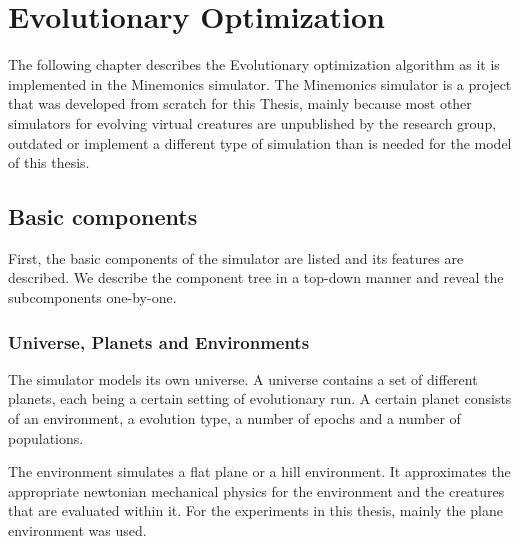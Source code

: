 \documentclass[main]{subfiles}
\begin{document}
\setcounter{chapter}{1}

\chapter{Evolutionary Optimization} %

\label{Chapter\thechapter} %


The following chapter describes the Evolutionary optimization algorithm as it is implemented in the Minemonics simulator. The Minemonics simulator is a project that was developed from scratch for this Thesis, mainly because most other simulators for evolving virtual creatures are unpublished by the research group, outdated or implement a different type of simulation than is needed for the model of this thesis.

\section{Basic components}

First, the basic components of the simulator are listed and its features are described. We describe the component tree in a top-down manner and reveal the subcomponents one-by-one. 

\subsection{Universe, Planets and Environments}

The simulator models its own universe. A universe contains a set of different planets, each being a certain setting of evolutionary run. A certain planet consists of an environment, a evolution type, a number of epochs and a number of populations. 

The environment simulates a flat plane or a hill environment. It approximates the appropriate newtonian mechanical physics for the environment and the creatures that are evaluated within it. For the experiments in this thesis, mainly the plane environment was used.
\end{document}
